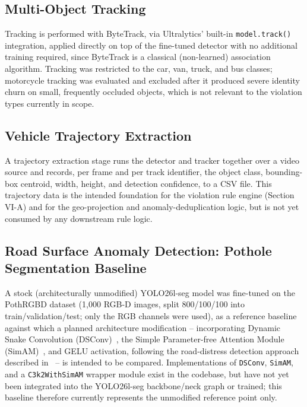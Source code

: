 \documentclass[conference]{IEEEtran}
\begin{document}
\subsection{Multi-Object Tracking}

Tracking is performed with ByteTrack, via Ultralytics' built-in \texttt{model.track()} integration, applied directly on top of the fine-tuned detector with no additional training required, since ByteTrack is a classical (non-learned) association algorithm. Tracking was restricted to the car, van, truck, and bus classes; motorcycle tracking was evaluated and excluded after it produced severe identity churn on small, frequently occluded objects, which is not relevant to the violation types currently in scope.

\subsection{Vehicle Trajectory Extraction}

A trajectory extraction stage runs the detector and tracker together over a video source and records, per frame and per track identifier, the object class, bounding-box centroid, width, height, and detection confidence, to a CSV file. This trajectory data is the intended foundation for the violation rule engine (Section VI-A) and for the geo-projection and anomaly-deduplication logic, but is not yet consumed by any downstream rule logic.

\subsection{Road Surface Anomaly Detection: Pothole Segmentation Baseline}

A stock (architecturally unmodified) YOLO26l-seg model was fine-tuned on the PothRGBD dataset (1{,}000 RGB-D images, split 800/100/100 into train/validation/test; only the RGB channels were used), as a reference baseline against which a planned architecture modification -- incorporating Dynamic Snake Convolution (DSConv)~\cite{dsconv}, the Simple Parameter-free Attention Module (SimAM)~\cite{simam}, and GELU activation, following the road-distress detection approach described in~\cite{roaddistress} -- is intended to be compared. Implementations of \texttt{DSConv}, \texttt{SimAM}, and a \texttt{C3k2WithSimAM} wrapper module exist in the codebase, but have not yet been integrated into the YOLO26l-seg backbone/neck graph or trained; this baseline therefore currently represents the unmodified reference point only.
\end{document}
